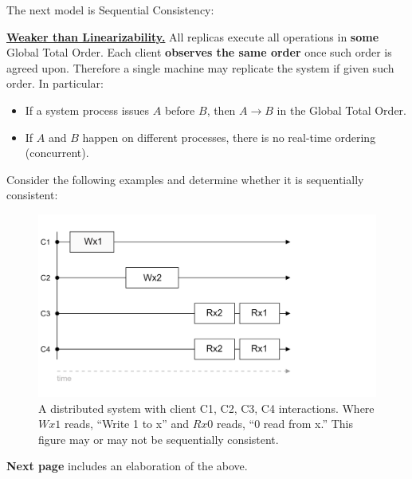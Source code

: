 \noindent
The next model is Sequential Consistency:
\begin{Def}
    
    \underline{\textbf{Weaker than Linearizability.}} All replicas execute all operations in \textbf{some} Global Total Order.
    Each client \textbf{observes the same order} once such order is agreed upon. Therefore a single machine may replicate the system
    if given such order. In particular:
    \begin{itemize}
        \item If a system process issues $A$ before $B$, then $A \rightarrow B$ in the Global Total Order.
        \item If $A$ and $B$ happen on different processes, there is no real-time ordering (concurrent).
    \end{itemize}
\end{Def}

\noindent
Consider the following examples and determine whether it is sequentially consistent:

\begin{figure}[h]
    \hspace{3em}
    \includegraphics[width=.9\textwidth]{Sections/consist/seq1.png}
    \caption{A distributed system with client C1, C2, C3, C4 interactions. Where $Wx1$ reads, ``Write 1 to x'' and $Rx0$ reads, ``0 read from x.'' This 
    figure may or may not be sequentially consistent.}
\end{figure}

\noindent
\textbf{Next page} includes an elaboration of the above.

\newpage 

